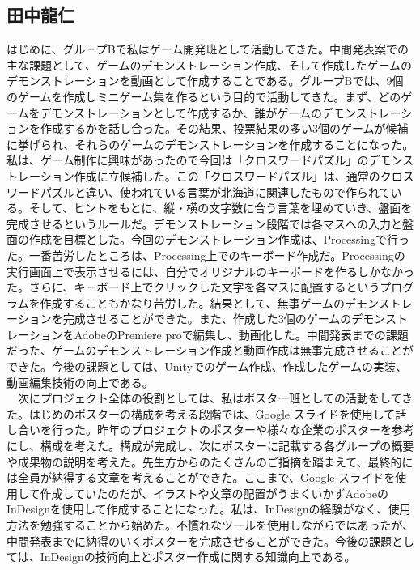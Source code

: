 \subsection{田中龍仁}
はじめに、グループBで私はゲーム開発班として活動してきた。中間発表案での主な課題として、ゲームのデモンストレーション作成、そして作成したゲームのデモンストレーションを動画として作成することである。グループBでは、9個のゲームを作成しミニゲーム集を作るという目的で活動してきた。まず、どのゲームをデモンストレーションとして作成するか、誰がゲームのデモンストレーションを作成するかを話し合った。その結果、投票結果の多い3個のゲームが候補に挙げられ、それらのゲームのデモンストレーションを作成することになった。私は、ゲーム制作に興味があったので今回は「クロスワードパズル」のデモンストレーション作成に立候補した。この「クロスワードパズル」は、通常のクロスワードパズルと違い、使われている言葉が北海道に関連したもので作られている。そして、ヒントをもとに、縦・横の文字数に合う言葉を埋めていき、盤面を完成させるというルールだ。デモンストレーション段階では各マスへの入力と盤面の作成を目標とした。今回のデモンストレーション作成は、Processingで行った。一番苦労したところは、Processing上でのキーボード作成だ。Processingの実行画面上で表示させるには、自分でオリジナルのキーボードを作るしかなかった。さらに、キーボード上でクリックした文字を各マスに配置するというプログラムを作成することもかなり苦労した。結果として、無事ゲームのデモンストレーションを完成させることができた。また、作成した3個のゲームのデモンストレーションをAdobeのPremiere proで編集し、動画化した。中間発表までの課題だった、ゲームのデモンストレーション作成と動画作成は無事完成させることができた。今後の課題としては、Unityでのゲーム作成、作成したゲームの実装、動画編集技術の向上である。\\
　次にプロジェクト全体の役割としては、私はポスター班としての活動をしてきた。はじめのポスターの構成を考える段階では、Google スライドを使用して話し合いを行った。昨年のプロジェクトのポスターや様々な企業のポスターを参考にし、構成を考えた。構成が完成し、次にポスターに記載する各グループの概要や成果物の説明を考えた。先生方からのたくさんのご指摘を踏まえて、最終的には全員が納得する文章を考えることができた。ここまで、Google スライドを使用して作成していたのだが、イラストや文章の配置がうまくいかずAdobeのInDesignを使用して作成することになった。私は、InDesignの経験がなく、使用方法を勉強することから始めた。不慣れなツールを使用しながらではあったが、中間発表までに納得のいくポスターを完成させることができた。今後の課題としては、InDesignの技術向上とポスター作成に関する知識向上である。

